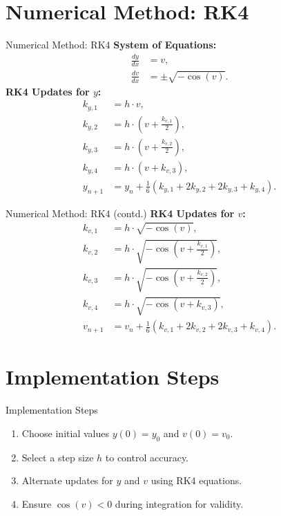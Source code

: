 \documentclass{beamer}
\begin{document}
\section{Numerical Method: RK4}
\begin{frame}{Numerical Method: RK4}
    \textbf{System of Equations:}
    \begin{align*}
        \frac{dy}{dx} &= v, \\
        \frac{dv}{dx} &= \pm \sqrt{-\cos(v)}.
    \end{align*}
    \vspace{0.5cm}
    \textbf{RK4 Updates for $y$:}
    \begin{align*}
        k_{y,1} &= h \cdot v, \\
        k_{y,2} &= h \cdot \left(v + \frac{k_{v,1}}{2}\right), \\
        k_{y,3} &= h \cdot \left(v + \frac{k_{v,2}}{2}\right), \\
        k_{y,4} &= h \cdot \left(v + k_{v,3}\right), \\
        y_{n+1} &= y_n + \frac{1}{6}\left(k_{y,1} + 2k_{y,2} + 2k_{y,3} + k_{y,4}\right).
    \end{align*}
\end{frame}

\begin{frame}{Numerical Method: RK4 (contd.)}
    \textbf{RK4 Updates for $v$:}
    \begin{align*}
        k_{v,1} &= h \cdot \sqrt{-\cos(v)}, \\
        k_{v,2} &= h \cdot \sqrt{-\cos\left(v + \frac{k_{v,1}}{2}\right)}, \\
        k_{v,3} &= h \cdot \sqrt{-\cos\left(v + \frac{k_{v,2}}{2}\right)}, \\
        k_{v,4} &= h \cdot \sqrt{-\cos\left(v + k_{v,3}\right)}, \\
        v_{n+1} &= v_n + \frac{1}{6}\left(k_{v,1} + 2k_{v,2} + 2k_{v,3} + k_{v,4}\right).
    \end{align*}
\end{frame}

\section{Implementation Steps}
\begin{frame}{Implementation Steps}
    \begin{enumerate}
        \item Choose initial values $y(0) = y_0$ and $v(0) = v_0$.
        \item Select a step size $h$ to control accuracy.
        \item Alternate updates for $y$ and $v$ using RK4 equations.
        \item Ensure $\cos(v) < 0$ during integration for validity.
    \end{enumerate}
\end{frame}
\end{document}

